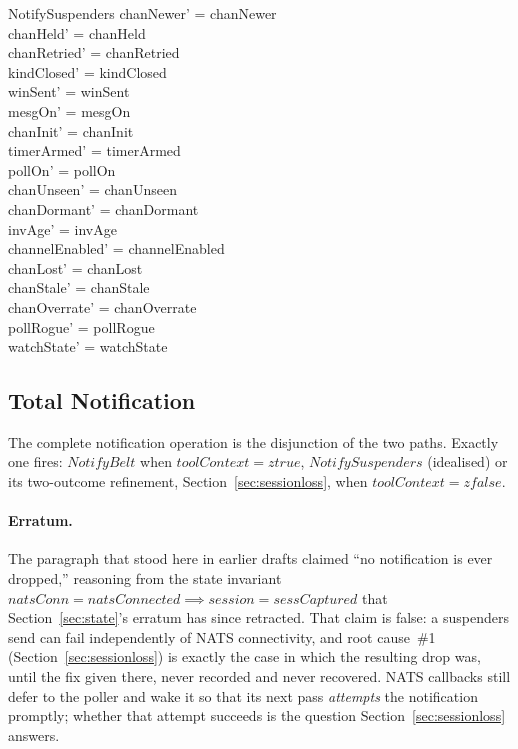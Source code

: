 \documentclass[a4paper,10pt,fleqn]{article}
\begin{document}
\begin{schema}{NotifySuspenders}
  chanNewer' = chanNewer \\
  chanHeld' = chanHeld \\
  chanRetried' = chanRetried \\
  kindClosed' = kindClosed \\
  winSent' = winSent \\
  mesgOn' = mesgOn \\
  chanInit' = chanInit \\
  timerArmed' = timerArmed \\
  pollOn' = pollOn \\
  chanUnseen' = chanUnseen \\
  chanDormant' = chanDormant \\
  invAge' = invAge \\
  channelEnabled' = channelEnabled \\
  chanLost' = chanLost \\
  chanStale' = chanStale \\
  chanOverrate' = chanOverrate \\
  pollRogue' = pollRogue \\
  watchState' = watchState
\end{schema}

\subsection{Total Notification}

The complete notification operation is the disjunction of the two
paths.  Exactly one fires: $NotifyBelt$ when $toolContext = ztrue$,
$NotifySuspenders$ (idealised) or its two-outcome refinement,
Section~\ref{sec:sessionloss}, when $toolContext = zfalse$.

\paragraph{Erratum.}  The paragraph that stood here in earlier drafts
claimed ``no notification is ever dropped,'' reasoning from the state
invariant $natsConn = natsConnected \implies session = sessCaptured$
that Section~\ref{sec:state}'s erratum has since retracted.  That
claim is false: a suspenders send can fail independently of NATS
connectivity, and root cause~\#1 (Section~\ref{sec:sessionloss}) is
exactly the case in which the resulting drop was, until the fix given
there, never recorded and never recovered.  NATS callbacks still defer
to the poller and wake it so that its next pass
\emph{attempts} the notification promptly; whether that attempt
succeeds is the question Section~\ref{sec:sessionloss} answers.
\end{document}

